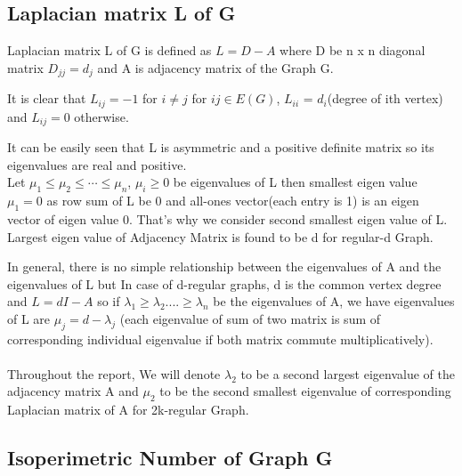 \documentclass[oneside]{book}
\begin{document}
     
     \subsection{Laplacian matrix L of G }
     
      Laplacian matrix L of G is defined as  $L = D - A$ where  D be n x n diagonal matrix $D_{jj} = d_{j}$ and A is adjacency matrix of the Graph G.\par
      
          
            
          It is clear that   $L_{ij} = -1$ for $i\neq j$  for $ij\in E(G)$,  $L_{ii}$ = $d_i$(degree of ith vertex) and   $L_{ij} = 0$ otherwise.\par
          
          It can be easily seen that L is asymmetric and a positive definite  matrix so its eigenvalues are real and positive. \\
         
          Let $\mu_{1} \leq \mu_{2} \leq \cdots \leq \mu_{n}$, $\mu_{i} \geq 0$  be  eigenvalues of L then smallest eigen value $\mu_{1} = 0$ as row sum of L  be 0 and all-ones vector(each entry is 1) is an eigen vector of eigen value 0. That's why we consider second smallest eigen value of L. Largest eigen value of Adjacency Matrix is found to be d for regular-d Graph. \par
          
          
            
         
In general, there is no simple relationship between the eigenvalues of
A and the eigenvalues of L but In case of d-regular graphs, d is the
common vertex degree and $L = dI - A$  so if $\lambda_{1} \geq \lambda_{2}....\geq \lambda_{n}$  be the eigenvalues of A, we have eigenvalues of L are $\mu_{j} = d - \lambda_{j}$ (each eigenvalue of sum of two matrix is sum of corresponding  individual eigenvalue if both matrix commute multiplicatively). \\\\
Throughout the report, We will denote $\lambda_{2} $ to be a second largest eigenvalue of the adjacency matrix A and $\mu_{2}$ to be the second smallest eigenvalue of corresponding Laplacian matrix of A for 2k-regular Graph.  
          
           
         
           \subsection{Isoperimetric Number of Graph G}
           
\end{document}
